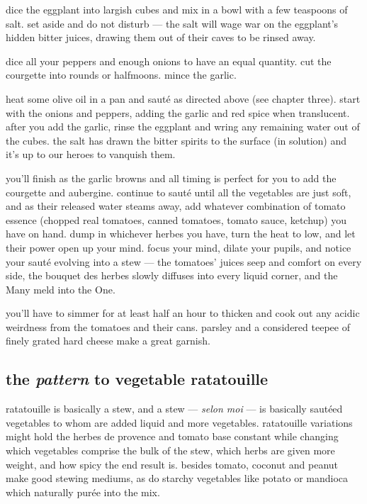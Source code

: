 dice the eggplant into largish cubes and mix in a bowl with a few teaspoons of 
salt. set aside and do not disturb --- the salt will wage war on the 
eggplant's hidden bitter juices, drawing them out of their caves to be rinsed 
away.

dice all your peppers and enough onions to have an equal quantity. cut the 
courgette into rounds or halfmoons. mince the garlic.

heat some olive oil in a pan and saut\'{e} as directed above (see chapter 
three). start with the onions and peppers, adding the garlic and red spice 
when translucent. after you add the garlic, rinse the eggplant and wring any 
remaining water out of the cubes. the salt has drawn the bitter spirits to the 
surface (in solution) and it's up to our heroes to vanquish them.

you'll finish as the garlic browns and all timing is perfect for you to add 
the \gls{courgette} and \gls{aubergine}. continue to saut\'{e} until all 
the vegetables are just soft, and as their released water steams away, add 
whatever combination of tomato essence (chopped real tomatoes, canned 
tomatoes, tomato sauce, ketchup) you have on hand. dump in whichever herbes 
you have, turn the heat to low, and let their power open up your mind. focus 
your mind, dilate your pupils, and notice your saut\'{e} evolving into a stew 
--- the tomatoes' juices seep and comfort on every side, the \gls{bouquet des herbes} slowly diffuses into every liquid corner, and the Many meld into the One. 

you'll have to simmer for at least half an hour to thicken and cook out any 
acidic weirdness from the tomatoes and their cans. parsley and a considered 
teepee of finely grated hard cheese make a great garnish.

\subsection{the \textit{pattern} to vegetable ratatouille}

ratatouille is basically a stew, and a stew --- \textit{\gls{selon moi}} --- is basically 
saut\'{e}ed vegetables to whom are added liquid and more vegetables. 
ratatouille variations might hold the herbes de provence and tomato base 
constant while changing which vegetables comprise the bulk of the stew, which 
herbs are given more weight, and how spicy the end result is. besides tomato, 
coconut and peanut make good stewing mediums, as do starchy vegetables like 
potato or mandioca which naturally pur\'{e}e into the mix. 

